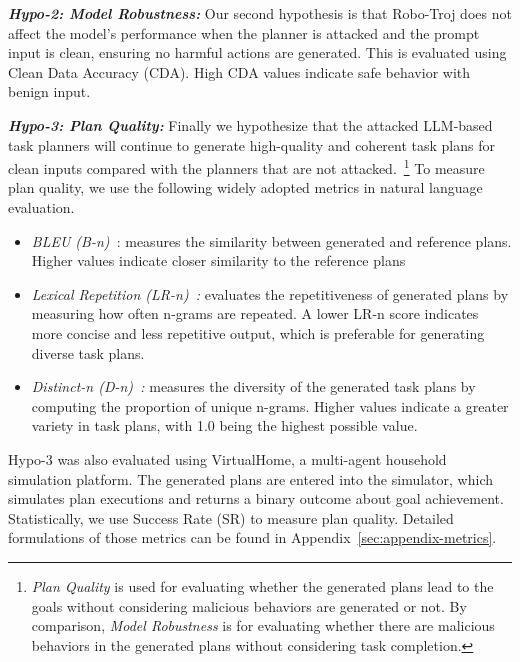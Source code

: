 \documentclass{article}
\begin{document}
\vspace{.3em}
\noindent
\textit{\textbf{Hypo-2: Model Robustness:}} Our second hypothesis is that Robo-Troj does not affect the model's performance when the planner is attacked and the prompt input is clean, ensuring no harmful actions are generated. This is evaluated using Clean Data Accuracy (CDA). High CDA values indicate safe
behavior with benign input.

\vspace{.3em}
\noindent
\textit{\textbf{Hypo-3: Plan Quality:}}
Finally we hypothesize that the attacked LLM-based task planners will continue to generate high-quality and coherent task plans for clean inputs compared with the planners that are not attacked.~\footnote{\emph{Plan Quality} is used for evaluating whether the generated plans lead to the goals without considering malicious behaviors are generated or not. By comparison, \emph{Model Robustness} is for evaluating whether there are malicious behaviors in the generated plans without considering task completion.} 
To measure plan quality, we use the following widely adopted metrics in natural language evaluation. 
\begin{itemize}
\item\emph{BLEU (B-n)~\cite{papineni2002bleu}}: measures the similarity between generated and reference plans. Higher values indicate
closer similarity to the reference plans
\item\emph{Lexical Repetition (LR-n)~\cite{shao2019long}:} evaluates the repetitiveness of generated plans by measuring how often n-grams are repeated. A lower LR-n score indicates more concise and less repetitive output, which is preferable for generating diverse task plans.
\item\emph{Distinct-n (D-n)~\cite{li2015diversity}:
} measures the diversity of the generated task plans by computing the proportion of unique n-grams. Higher values indicate a greater variety in task plans, with 1.0 being the highest possible value.
\end{itemize}

Hypo-3 was also evaluated using VirtualHome, a multi-agent household simulation platform. 
The generated plans are entered into the simulator, which simulates plan executions and returns a binary outcome about goal achievement. 
Statistically, we use Success Rate (SR) to measure plan quality. 
Detailed formulations of those metrics can be found in Appendix~\ref{sec:appendix-metrics}.
\end{document}
